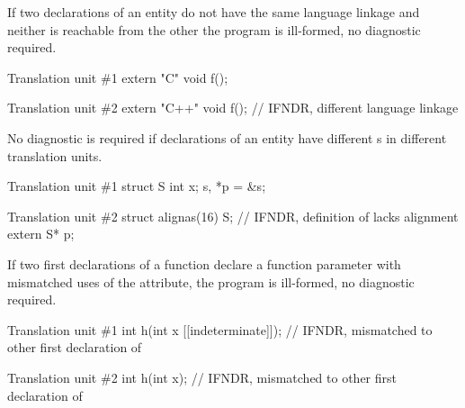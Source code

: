 
\pnum
If two declarations of an entity
do not have the same language linkage
and neither is reachable from the other
the program is ill-formed, no diagnostic required.

\pnum
\begin{example}
\begin{codeblocktu}{Translation unit \#1}
extern "C" { void f(); }
\end{codeblocktu}
\begin{codeblocktu}{Translation unit \#2}
extern "C++" { void f(); }  // IFNDR, different language linkage
\end{codeblocktu}
\end{example}


\pnum
No diagnostic is required if declarations of an entity have different s in different
translation units.

\pnum
\begin{example}
\begin{codeblocktu}{Translation unit \#1}
struct S { int x; } s, *p = &s;
\end{codeblocktu}
\begin{codeblocktu}{Translation unit \#2}
struct alignas(16) S;   // IFNDR, definition of  lacks alignment
extern S* p;
\end{codeblocktu}
\end{example}


\pnum
If two first declarations of a function
declare a function parameter with
mismatched uses of the  attribute,
the program is ill-formed, no diagnostic required.

\pnum
\begin{example}
\begin{codeblocktu}{Translation unit \#1}
int h(int x [[indeterminate]]); // IFNDR, mismatched \tcode{[[indeterminate]]} to other first declaration of 
\end{codeblocktu}
\begin{codeblocktu}{Translation unit \#2}
int h(int x);                   // IFNDR, mismatched \tcode{[[indeterminate]]} to other first declaration of 
\end{codeblocktu}
\end{example}

